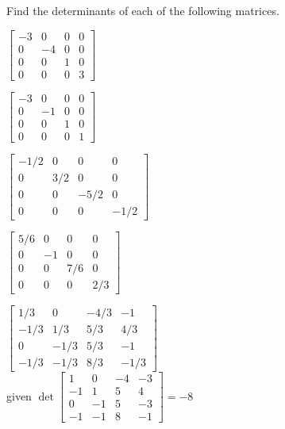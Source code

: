 \begin{exercise}  
Find the determinants of each of the following matrices.
\begin{Parts}
\item \(\begin{bmatrix} -3&0&0&0
\\0&-4&0&0
\\0&0&1&0
\\0&0&0&3 \end{bmatrix}\)

\begin{OmitV1}
\item \(\begin{bmatrix} -3&0&0&0
\\0&-1&0&0
\\0&0&1&0
\\0&0&0&1 \end{bmatrix}\)

\item \(\begin{bmatrix} -1/2&0&0&0
\\0&3/2&0&0
\\0&0&-5/2&0
\\0&0&0&-1/2 \end{bmatrix}\)
\end{OmitV1}

\item \(\begin{bmatrix} 5/6&0&0&0
\\0&-1&0&0
\\0&0&7/6&0
\\0&0&0&2/3 \end{bmatrix}\)


\item \(\begin{bmatrix} 1/3&0&-4/3&-1
\\-1/3&1/3&5/3&4/3
\\0&-1/3&5/3&-1
\\-1/3&-1/3&8/3&-1/3 \end{bmatrix}\)
\\given \(\det\begin{bmatrix} 1&0&-4&-3
\\-1&1&5&4
\\0&-1&5&-3
\\-1&-1&8&-1 \end{bmatrix}= -8 \)


\end{Parts}
\end{exercise}
